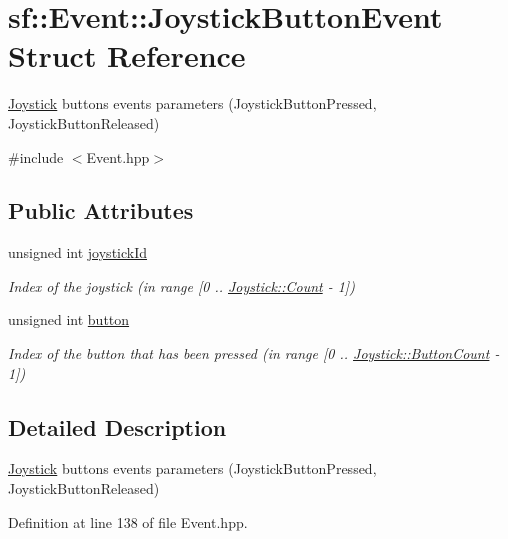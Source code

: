 \hypertarget{structsf_1_1_event_1_1_joystick_button_event}{\section{sf\-:\-:Event\-:\-:Joystick\-Button\-Event Struct Reference}
\label{structsf_1_1_event_1_1_joystick_button_event}
}


\hyperlink{classsf_1_1_joystick}{Joystick} buttons events parameters (Joystick\-Button\-Pressed, Joystick\-Button\-Released)  




{\ttfamily \#include $<$Event.\-hpp$>$}

\subsection*{Public Attributes}
\begin{DoxyCompactItemize}
\item 
unsigned int \hyperlink{structsf_1_1_event_1_1_joystick_button_event_a2f80ecdb964a5ae0fc30726a404c41ec}{joystick\-Id}
\begin{DoxyCompactList}\small\item\em Index of the joystick (in range \mbox{[}0 .. \hyperlink{classsf_1_1_joystick_ac4ca4ee36e2cf04ecf931316e4463ca6a6e0a2a95bc1da277610c04d80f52715e}{Joystick\-::\-Count} -\/ 1\mbox{]}) \end{DoxyCompactList}\item 
unsigned int \hyperlink{structsf_1_1_event_1_1_joystick_button_event_a6412e698a2f7904c5aa875a0d1b34da4}{button}
\begin{DoxyCompactList}\small\item\em Index of the button that has been pressed (in range \mbox{[}0 .. \hyperlink{classsf_1_1_joystick_ac4ca4ee36e2cf04ecf931316e4463ca6a2f1b8a0a59f2c12a4775c0e1e69e1816}{Joystick\-::\-Button\-Count} -\/ 1\mbox{]}) \end{DoxyCompactList}\end{DoxyCompactItemize}


\subsection{Detailed Description}
\hyperlink{classsf_1_1_joystick}{Joystick} buttons events parameters (Joystick\-Button\-Pressed, Joystick\-Button\-Released) 

Definition at line 138 of file Event.\-hpp.



